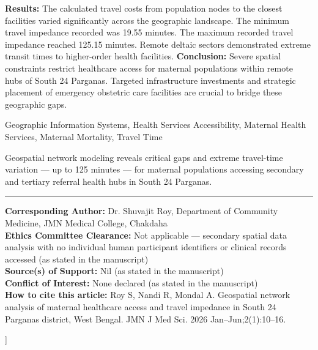 \documentclass[10pt,twocolumn,letterpaper]{article}
\begin{document}
{{\bfseries Results:} The calculated travel costs from population nodes to the closest facilities varied significantly across the geographic landscape. The minimum travel impedance recorded was 19.55 minutes. The maximum recorded travel impedance reached 125.15 minutes. Remote deltaic sectors demonstrated extreme transit times to higher-order health facilities.
{\bfseries Conclusion:} Severe spatial constraints restrict healthcare access for maternal populations within remote hubs of South 24 Parganas. Targeted infrastructure investments and strategic placement of emergency obstetric care facilities are crucial to bridge these geographic gaps.\par\vspace{6pt}
 Geographic Information Systems, Health Services Accessibility, Maternal Health Services, Maternal Mortality, Travel Time\par\vspace{6pt}
 Geospatial network modeling reveals critical gaps and extreme travel-time variation --- up to 125 minutes --- for maternal populations accessing secondary and tertiary referral health hubs in South 24 Parganas.\par
\vspace{6pt}\noindent\rule{\textwidth}{0.4pt}\par\vspace{4pt}
\begin{center}\begin{minipage}{0.883\textwidth}\small\raggedright
{\bfseries Corresponding Author:} Dr. Shuvajit Roy, Department of Community Medicine, JMN Medical College, Chakdaha\\
{\bfseries Ethics Committee Clearance:} Not applicable --- secondary spatial data analysis with no individual human participant identifiers or clinical records accessed (as stated in the manuscript)\\
{\bfseries Source(s) of Support:} Nil (as stated in the manuscript)\\
{\bfseries Conflict of Interest:} None declared (as stated in the manuscript)\\
{\bfseries How to cite this article:} Roy S, Nandi R, Mondal A. Geospatial network analysis of maternal healthcare access and travel impedance in South 24 Parganas district, West Bengal. JMN J Med Sci. 2026 Jan--Jun;2(1):10--16.
\end{minipage}\end{center}
}]
\clearpage
\end{document}
